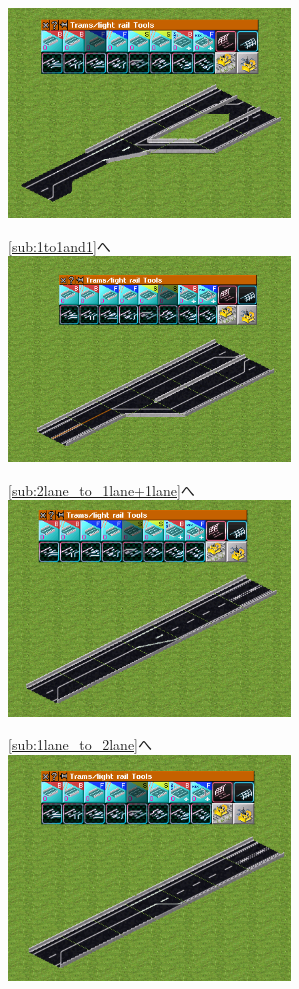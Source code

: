 \documentclass{jarticle}
\begin{document}
\begin{multicols}{2}

  \includegraphics[width = 75mm]{picture/20210214-road-2-8.png}

  \ref{sub:1to1and1}へ\\

  \includegraphics[width = 75mm]{picture/20210214-road-3-6.png}

  \ref{sub:2lane_to_1lane+1lane}へ\\

  \includegraphics[width = 75mm]{picture/20210214-road-4-6.png}

  \ref{sub:1lane_to_2lane}へ\\

  \includegraphics[width = 75mm]{picture/20210214-road-4-7.png}


\end{multicols}
\end{document}
